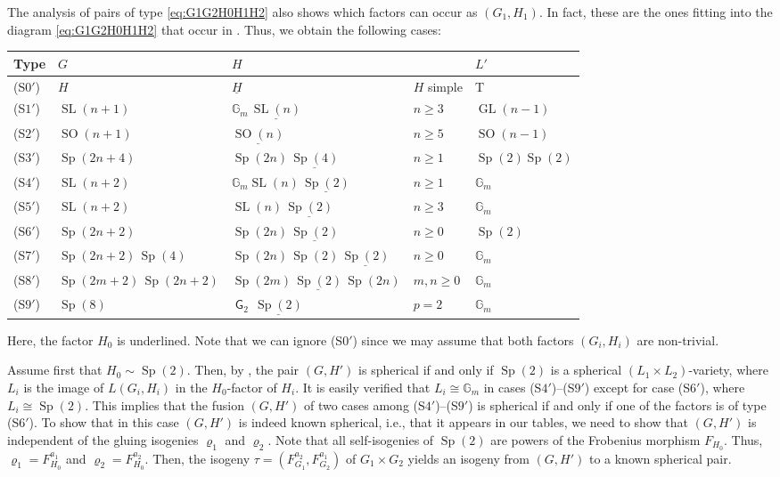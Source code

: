 \documentclass[12pt]{amsart}
\renewcommand{\rho}{\varrho}
\newcommand\BBG{{\mathbb G}}
\newcommand\G{{\operatorname{\mathsf G}}}
\newcommand\Gm{{{\BBG}_m}}
\newcommand\GL{\operatorname{GL}}
\newcommand\SL{\operatorname{SL}}
\newcommand\Sp{\operatorname{Sp}}
\newcommand\SOO{\operatorname{SO}}
\numberwithin{equation}{section}
\theoremstyle{definition}
\newcommand\ul[1]{\underline{#1}}
\begin{document}
The analysis of pairs of type \eqref{eq:G1G2H0H1H2} also shows which
factors can occur as $(G_1,H_1)$. In fact, these are the ones fitting
into the diagram \eqref{eq:G1G2H0H1H2} that occur in
. Thus, we obtain the following cases:
\begin{center}
  \begin{tabular}{l|l|l|l|l}
    Type&$G$&$H$&&$L'$\\
    \hline
    (S$0'$)&$H$&$\ul{H}$&$H$ simple&T\\
    (S$1'$)&$\SL(n+1)$&$\Gm\,\ul{\SL(n)}$&$n\geqslant 3$&$\GL(n-1)$\\
    (S$2'$)&$\SOO(n+1)$&$\ul{\SOO(n)}$&$n\geqslant 5$&$\SOO(n-1)$\\
    (S$3'$)&$\Sp(2n+4)$&$\Sp(2n)\,\ul{\Sp(4)}$&$n \geqslant 1$&$\Sp(2)\Sp(2)$\\
    (S$4'$)&$\SL(n+2)$&$\Gm\SL(n)\,\ul{\Sp(2)}$&$n \geqslant 1$&$\Gm$\\
    (S$5'$)&$\SL(n+2)$&$\SL(n)\,\ul{\Sp(2)}$&$n \geqslant 3$&$\Gm$\\
    (S$6'$)&$\Sp(2n+2)$&$\Sp(2n)\,\ul{\Sp(2)}$&$n \geqslant 0$&$\Sp(2)$\\
    (S$7'$)&$\Sp(2n+2)\,\Sp(4)$&$\Sp(2n)\,\Sp(2)\,\ul{\Sp(2)}$&$n \geqslant 0$&$\Gm$\\
    (S$8'$)&$\Sp(2m+2)\,\Sp(2n+2)$&$\Sp(2m)\,\ul{\Sp(2)}\,\Sp(2n)$&$m,n \geqslant 0$&$\Gm$\\	
    (S$9'$)&$\Sp(8)$&$\G_2\,\ul{\Sp(2)}$&$p=2$&$\Gm$
  \end{tabular}	
\end{center}

Here, the factor $H_0$ is underlined. Note that we can ignore
(S$0'$) since we may assume that both factors $(G_i,H_i)$ are
non-trivial.

Assume first that $H_0\sim\Sp(2)$. Then, by , the pair $(G,H')$ is
spherical if and only if $\Sp(2)$ is a spherical
$(L_1\times L_2)$-variety, where $L_i$ is the image of $L(G_i,H_i)$ in
the $H_0$-factor of $H_i$. It is easily verified that $L_i\cong \Gm$
in cases (S$4'$)--(S$9'$) except for case
(S$6'$), where $L_i\cong\Sp(2)$. This implies that the fusion
$(G,H')$ of two cases among (S$4'$)--(S$9'$) is spherical
if and only if one of the factors is of type (S$6'$). To show
that in this case $(G,H')$ is indeed known spherical, i.e., that
it appears in our tables, we need to show that $(G,H')$ is independent
of the gluing isogenies $\rho_1$ and $\rho_2$. Note that all
self-isogenies of $\Sp(2)$ are powers of the Frobenius morphism
$F_{H_0}$. Thus, $\rho_1=F_{H_0}^{a_1}$ and
$\rho_2=F_{H_0}^{a_2}$. Then, the isogeny
$\tau=(F_{G_1}^{a_2},F_{G_2}^{a_1})$ of $G_1\times G_2$ yields an
isogeny from $(G,H')$ to a known spherical pair.
\end{document}
